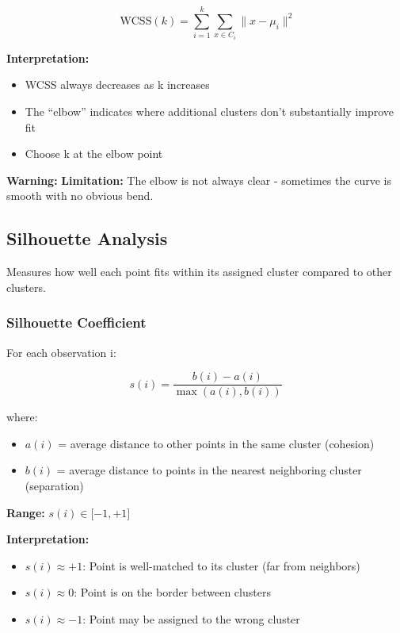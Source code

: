 \documentclass[
]{article}
\begin{document}
\[\text{ WCSS}(k) = \sum_{i = 1}^{k}\sum_{x \in C_{i}}\| x - \mu_{i}\|^{2}\]

\textbf{Interpretation:}

\begin{itemize}
\item
  WCSS always decreases as k increases
\item
  The ``elbow'' indicates where additional clusters don't substantially
  improve fit
\item
  Choose k at the elbow point
\end{itemize}

\textbf{Warning: } \textbf{Limitation:} The elbow is not always clear -
sometimes the curve is smooth with no obvious bend.

\textbf{ }

\subsection{Silhouette Analysis}

Measures how well each point fits within its assigned cluster compared
to other clusters.

\subsubsection{Silhouette Coefficient}

For each observation i:

\[s(i) = \frac{b(i) - a(i)}{\max(a(i),b(i))}\]

where:

\begin{itemize}
\item
  \(a(i)\) = average distance to other points in the same cluster
  (cohesion)
\item
  \(b(i)\) = average distance to points in the nearest neighboring
  cluster (separation)
\end{itemize}

\textbf{Range:} \(s(i) \in \lbrack - 1, + 1\rbrack\)

\textbf{Interpretation:}

\begin{itemize}
\item
  \(s(i) \approx + 1\): Point is well-matched to its cluster (far from
  neighbors)
\item
  \(s(i) \approx 0\): Point is on the border between clusters
\item
  \(s(i) \approx - 1\): Point may be assigned to the wrong cluster
\end{itemize}
\end{document}
